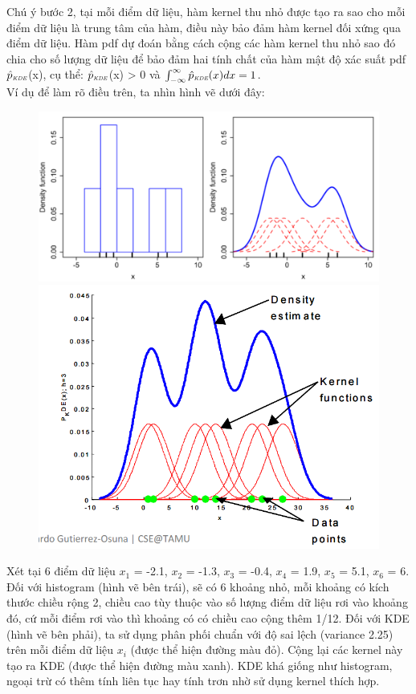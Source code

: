 \documentclass[a4paper, 13pt]{report}
\begin{document}
Chú ý bước 2, tại mỗi điểm dữ liệu, hàm kernel thu nhỏ được tạo ra sao cho mỗi điểm dữ liệu là trung tâm của hàm, điều này bảo đảm hàm kernel đối xứng qua điểm dữ liệu. Hàm pdf dự đoán bằng cách cộng các hàm kernel thu nhỏ sao đó chia cho số lượng dữ liệu để bảo đảm hai tính chất của hàm mật độ xác suất pdf $\hat{p}_\textit{\tiny\tiny KDE}$(x), cụ thể: $\hat{p}_\textit{\tiny\tiny KDE}$(x) > 0 và $\int_{-\infty}^{\infty} \hat{p}_\textit{\tiny\tiny KDE}(x)dx = 1$.\\
Ví dụ để làm rõ điều trên, ta nhìn hình vẽ dưới đây:
\FloatBarrier
\begin{figure}[!htb]
  \includegraphics[width=\linewidth]{500px-Comparison_of_1D_histogram_and_KDE}
\endminipage
{}
  \includegraphics[width=\linewidth]{KDE1}
\endminipage
\end{figure}
\FloatBarrier
Xét tại 6 điểm dữ liệu $x_1$ = -2.1, $x_2$ = -1.3, $x_3$ = -0.4, $x_4$ = 1.9, $x_5$ = 5.1, $x_6$ = 6. Đối với histogram (hình vẽ bên trái), sẽ có 6 khoảng nhỏ, mỗi khoảng có kích thước chiều rộng 2, chiều cao tùy thuộc vào số lượng điểm dữ liệu rơi vào khoảng đó, cứ mỗi điểm rơi vào thì khoảng có có chiều cao cộng thêm 1/12. Đối với KDE (hình vẽ bên phải), ta sử dụng phân phối chuẩn với độ sai lệch (variance 2.25) trên mỗi điểm dữ liệu $x_i$ (được thể hiện đường màu đỏ). Cộng lại các kernel này tạo ra KDE (được thể hiện đường màu xanh). KDE khá giống như histogram, ngoại trừ có thêm tính liên tục hay tính trơn nhờ sử dụng kernel thích hợp.\\  
\end{document}
